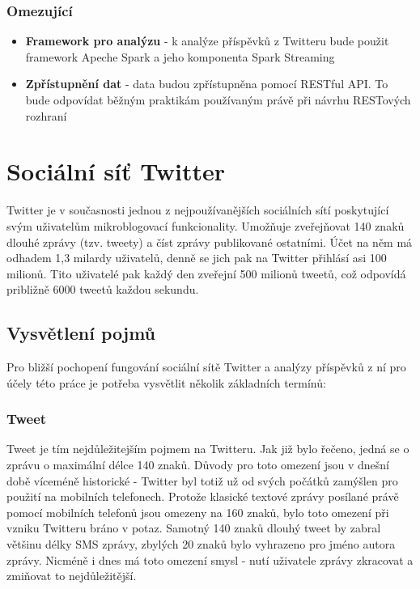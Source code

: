 \documentclass[thesis=B,czech]{FITthesis}[2012/06/26]
\begin{document}
\subsubsection{Omezující}
\begin{itemize}
\item \textbf{Framework pro analýzu} - k analýze příspěvků z Twitteru bude použit framework Apeche Spark a jeho komponenta Spark Streaming
\item \textbf{Zpřístupnění dat} - data budou zpřístupněna pomocí RESTful API. To bude odpovídat běžným praktikám používaným právě při návrhu RESTových rozhraní
\end{itemize}

\section{Sociální síť Twitter}
\label{twitter}
	
	Twitter je v současnosti jednou z nejpoužívanějších sociálních sítí poskytující svým uživatelům mikroblogovací funkcionality. Umožňuje zveřejňovat 140 znaků dlouhé zprávy (tzv. tweety) a číst zprávy publikované ostatními. Účet na něm má odhadem 1,3 milardy uživatelů, denně se jich pak na Twitter přihlásí asi 100 milionů\cite{twitter-stats}. Tito uživatelé pak každý den zveřejní 500 milionů tweetů, což odpovídá približně 6000 tweetů každou sekundu\cite{twitter-stats-2}. 

\subsection{Vysvětlení pojmů}
Pro bližší pochopení fungování sociální sítě Twitter a analýzy příspěvků z ní pro účely této práce je potřeba vysvětlit několik základních termínů:

\subsubsection{Tweet}

Tweet je tím nejdůležitejším pojmem na Twitteru. Jak již bylo řečeno, jedná se o zprávu o maximální délce 140 znaků. Důvody pro toto omezení jsou v dnešní době víceméně historické - Twitter byl totiž už od svých počátků zamýšlen pro použití na mobilních telefonech. Protože klasické textové zprávy posílané právě pomocí mobilních telefonů jsou omezeny na 160 znaků, bylo toto omezení při vzniku Twitteru bráno v potaz. Samotný 140 znaků dlouhý tweet by zabral většinu délky SMS zprávy, zbylých 20 znaků bylo vyhrazeno pro jméno autora zprávy\cite{twitter-140}. Nicméně i dnes má toto omezení smysl - nutí uživatele zprávy zkracovat a zmiňovat to nejdůležitější. 
\end{document}
